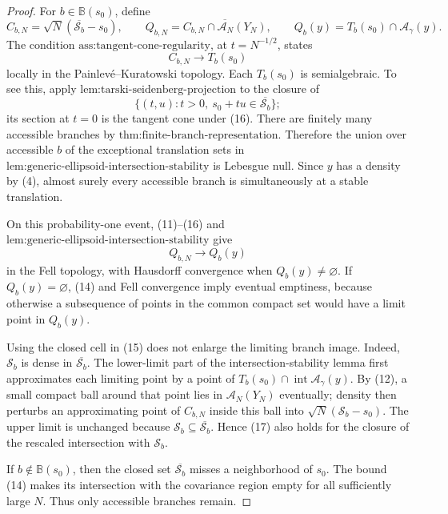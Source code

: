 \documentclass{article}
\begin{document}
\begin{proof}
For \(b\in\mathbb B(s_0)\), define
\[
 C_{b,N}=\sqrt N(\overline{\mathcal S_b}-s_0),
 \qquad
 Q_{b,N}=\overline{C_{b,N}\cap\mathcal A_N(Y_N)},
 \qquad
 Q_b(y)=T_b(s_0)\cap\mathcal A_\gamma(y).
 \tag{15}
\]
The condition \(\text{ass:tangent-cone-regularity}\), at \(t=N^{-1/2}\), states
\[
 C_{b,N}\longrightarrow T_b(s_0)
 \tag{16}
\]
locally in the Painlev\'e--Kuratowski topology. Each \(T_b(s_0)\) is semialgebraic. To see this, apply \(\text{lem:tarski-seidenberg-projection}\) to the closure of
\[
 \{(t,u):t>0,\ s_0+t u\in\overline{\mathcal S_b}\};
\]
its section at \(t=0\) is the tangent cone under (16). There are finitely many accessible branches by \(\text{thm:finite-branch-representation}\). Therefore the union over accessible \(b\) of the exceptional translation sets in \(\text{lem:generic-ellipsoid-intersection-stability}\) is Lebesgue null. Since \(y\) has a density by (4), almost surely every accessible branch is simultaneously at a stable translation.

On this probability-one event, (11)--(16) and \(\text{lem:generic-ellipsoid-intersection-stability}\) give
\[
 Q_{b,N}\longrightarrow Q_b(y)
 \tag{17}
\]
in the Fell topology, with Hausdorff convergence when \(Q_b(y)\ne\varnothing\). If \(Q_b(y)=\varnothing\), (14) and Fell convergence imply eventual emptiness, because otherwise a subsequence of points in the common compact set would have a limit point in \(Q_b(y)\).

Using the closed cell in (15) does not enlarge the limiting branch image. Indeed, \(\mathcal S_b\) is dense in \(\overline{\mathcal S_b}\). The lower-limit part of the intersection-stability lemma first approximates each limiting point by a point of \(T_b(s_0)\cap\operatorname{int}\mathcal A_\gamma(y)\). By (12), a small compact ball around that point lies in \(\mathcal A_N(Y_N)\) eventually; density then perturbs an approximating point of \(C_{b,N}\) inside this ball into \(\sqrt N(\mathcal S_b-s_0)\). The upper limit is unchanged because \(\mathcal S_b\subseteq\overline{\mathcal S_b}\). Hence (17) also holds for the closure of the rescaled intersection with \(\mathcal S_b\).

If \(b\notin\mathbb B(s_0)\), then the closed set \(\overline{\mathcal S_b}\) misses a neighborhood of \(s_0\). The bound (14) makes its intersection with the covariance region empty for all sufficiently large \(N\). Thus only accessible branches remain.


\end{proof}
\end{document}
